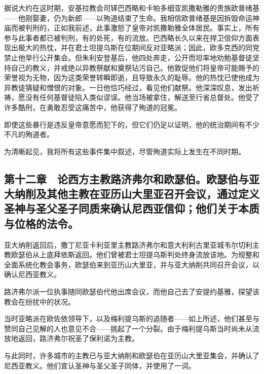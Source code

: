 据说大约在这时期，安基拉教会司铎巴西略和卡帕多细亚凯撒勒雅的贵族欧普绪基——他刚娶妻，仍为新郎——以殉道结束了生命。我相信欧普绪基是因拆毁命运神庙而被判刑的，正如我前述，此事激怒了皇帝对凯撒勒雅全体居民。事实上，所有参与此事者都已被判刑，有的处死，有的流放。巴西略长久以来在捍卫信仰方面表现出极大的热忱，并在君士坦提乌斯在位期间反对亚略派；因此，欧多克西的同党禁止他举行公开集会。但朱利安登基后，他四处奔走，公开而坦率地劝勉基督徒坚持自己的教义，并戒绝以异教祭献和奠祭玷污自己。他敦促他们将皇帝可能赐予的荣誉视为无物，因为这类荣誉转瞬即逝，且导致永久的耻辱。他的热忱已使他成为异教徒猜疑和憎恨的对象。一日他恰巧经过，看见他们献祭。他深深叹息，发出祈祷，愿没有任何基督徒陷入类似谬误。他当场被拿住，解送至行省总督处。他受了许多酷刑，在勇敢忍受这痛苦中，他获得了殉道的冠冕。\par

即使这些暴行是违反皇帝意愿而犯下的，但它们仍足以证明，他的统治期间有不少不凡的殉道者。\par

为清晰起见，我将所有这些事件集中叙述，尽管殉道实际上发生在不同时期。\par


\subsection{第十二章　论西方主教路济弗尔和欧瑟伯。欧瑟伯与亚大纳削及其他主教在亚历山大里亚召开会议，通过定义圣神与圣父圣子同质来确认尼西亚信仰；他们关于本质与位格的法令。}

亚大纳削返回后，撒丁尼亚卡利亚里主教路济弗尔和意大利利古里亚城韦尔切利主教欧瑟伯从上底拜依斯返回。他们曾被君士坦提乌斯判处终身流放该地。为规整和全面系统化教会事务，欧瑟伯来到亚历山大里亚，并与亚大纳削共同召开会议，以确认尼西亚教义。\par

路济弗尔派一位执事随同欧瑟伯代他出席会议，而他自己去了安提约基雅，探望该教会在纷扰中的状况。\par

当时亚略派在欧佐依领导下，以及梅利提乌斯的追随者——如上所述，他们甚至与赞同自己见解的人也意见不合——挑起了一个分裂。由于梅利提乌斯当时尚未从流放地返回，路济弗尔祝圣了保利诺为主教。\par

与此同时，许多城市的主教已与亚大纳削和欧瑟伯在亚历山大里亚集会，并确认了尼西亚教义。他们宣认圣神与圣父圣子同体，并使用了一词。\par

